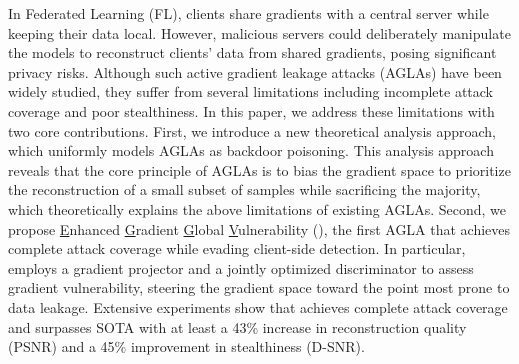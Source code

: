 In Federated Learning (FL), clients share gradients with a central server while keeping their data local. However, malicious servers could deliberately manipulate the models to reconstruct clients' data from shared gradients, posing significant privacy risks. Although such active gradient leakage attacks (AGLAs) have been widely studied, they suffer from several limitations including incomplete attack coverage and poor stealthiness. In this paper, we address these limitations with two core contributions. First, we introduce a new theoretical analysis approach, which uniformly models AGLAs as backdoor poisoning. This analysis approach reveals that the core principle of AGLAs is to bias the gradient space to prioritize the reconstruction of a small subset of samples while sacrificing the majority, which theoretically explains the above limitations of existing AGLAs. Second, we propose \underline{E}nhanced \underline{G}radient \underline{G}lobal \underline{V}ulnerability (\name), the first AGLA that achieves complete attack coverage while evading client-side detection. In particular, \name employs a gradient projector and a jointly optimized discriminator to assess gradient vulnerability, steering the gradient space toward the point most prone to data leakage. Extensive experiments show that \name achieves complete attack coverage and surpasses SOTA with at least a 43\% increase in reconstruction quality (PSNR) and a 45\% improvement in stealthiness (D-SNR).